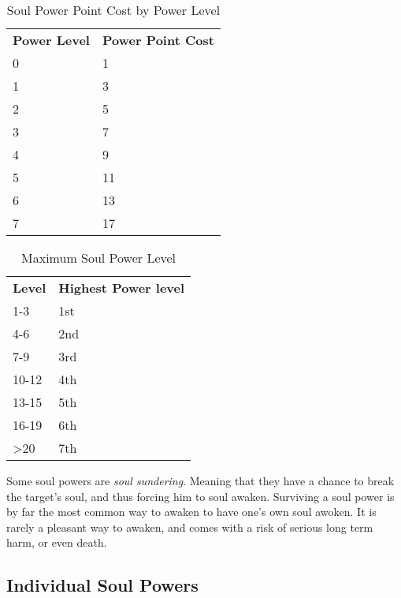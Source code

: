 \begin{table}[!htb]
  \caption{Soul Power Point Cost by Power Level}
  \begin{tabular}{p{2cm} p{3cm}}
    \textbf{Power Level} & \textbf{Power Point Cost} \\
    0 &  1 \\
    1 &  3 \\
    2 &  5 \\
    3 &  7 \\
    4 &  9 \\
    5 & 11 \\
    6 & 13 \\
    7 & 17 \\
  \end{tabular}
\end{table}

\begin{table}[!htb]
  \caption{Maximum Soul Power Level}
  \begin{tabular}{p{2cm} p{3cm}}
    \textbf{Level} & \textbf{Highest Power level} \\
    1-3   & 1st \\
    4-6   & 2nd \\
    7-9   & 3rd \\
    10-12 & 4th \\
    13-15 & 5th \\
    16-19 & 6th \\
    >20   & 7th \\
  \end{tabular}
\end{table}

Some soul powers are \emph{soul sundering}. Meaning that they have a chance
to break the target's soul, and thus forcing him to soul awaken. Surviving a
soul power is by far the most common way to awaken to have one's own soul
awoken. It is rarely a pleasant way to awaken, and comes with a risk of
serious long term harm, or even death.

\subsection{Individual Soul Powers}

